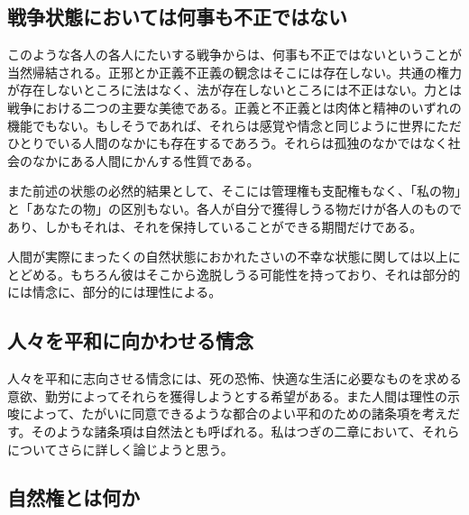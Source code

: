 \subsection{戦争状態においては何事も不正ではない}

このような各人の各人にたいする戦争からは、何事も不正ではないということが当然帰結される。正邪とか正義不正義の観念はそこには存在しない。共通の権力が存在しないところに法はなく、法が存在しないところには不正はない。力とは戦争における二つの主要な美徳である。正義と不正義とは肉体と精神のいずれの機能でもない。もしそうであれば、それらは感覚や情念と同じように世界にただひとりでいる人間のなかにも存在するであろう。それらは孤独のなかではなく社会のなかにある人間にかんする性質である。


また前述の状態の必然的結果として、そこには管理権も支配権もなく、「私の物」と「あなたの物」の区別もない。各人が自分で獲得しうる物だけが各人のものであり、しかもそれは、それを保持していることができる期間だけである。



人間が実際にまったくの自然状態におかれたさいの不幸な状態に関しては以上にとどめる。もちろん彼はそこから逸脱しうる可能性を持っており、それは部分的には情念に、部分的には理性による。



\subsection{人々を平和に向かわせる情念}

人々を平和に志向させる情念には、死の恐怖、快適な生活に必要なものを求める意欲、勤労によってそれらを獲得しようとする希望がある。また人間は理性の示唆によって、たがいに同意できるような都合のよい平和のための諸条項を考えだす。そのような諸条項は自然法とも呼ばれる。私はつぎの二章において、それらについてさらに詳しく論じようと思う。










\subsection{自然権とは何か}

